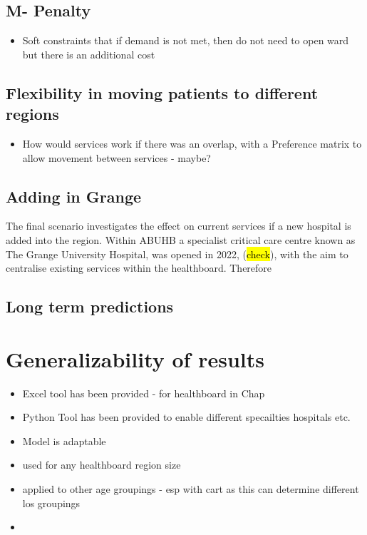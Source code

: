 \documentclass[../thesis.tex]{subfiles}
\begin{document}
\subsection{M- Penalty}
\begin{itemize}
    \item Soft constraints that if demand is not met, then do not need to open ward but there is an additional cost
\end{itemize}
\subsection{Flexibility in moving patients to different regions}
\begin{itemize}
    \item How would services work if there was an overlap, with a Preference matrix to allow movement between services - maybe? 
\end{itemize}

\subsection{Adding in Grange}
The final scenario investigates the effect on current services if a new hospital is added into the region. Within ABUHB a specialist critical care centre known as The Grange University Hospital, was opened in 2022, (\hl{check}), with the aim to centralise existing services within the healthboard. Therefore 
\subsection{Long term predictions}


\section{Generalizability of results}
\begin{itemize}
\item Excel tool has been provided - for healthboard in Chap
\item Python Tool has been provided to enable different specailties  hospitals etc.
    \item Model is adaptable
    \item used for any healthboard region size
    \item applied to other age groupings - esp with cart as this can determine different los groupings
    \item 
\end{itemize}
\end{document}
